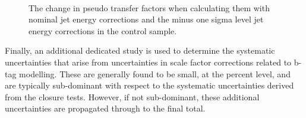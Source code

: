 \begin{figure}[]
  \centering
   ~~
  \caption{\label{fig:jes-syst-doubleMu} The change in pseudo transfer
  factors when calculating them with nominal jet energy corrections
  and the minus one sigma level jet energy corrections in the \mmj
  control sample.}
\end{figure}

Finally, an additional dedicated study is used to determine the
systematic uncertainties that arise from uncertainties in scale factor
corrections related to b-tag modelling. These are generally found to
be small, at the percent level, and are typically sub-dominant with
respect to the systematic uncertainties derived from the closure
tests. However, if not sub-dominant, these additional uncertainties
are propagated through to the final total.
